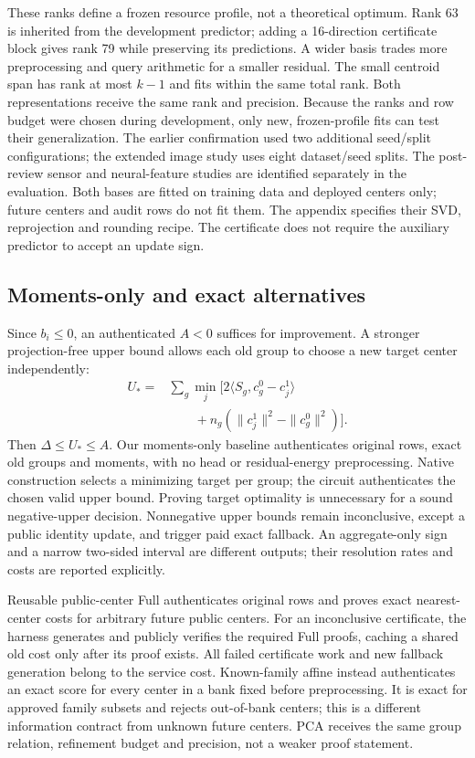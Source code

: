 These ranks define a frozen resource profile, not a theoretical optimum.
Rank 63 is inherited from the development predictor; adding a 16-direction
certificate block gives rank 79 while preserving its predictions. A wider
basis trades more preprocessing and query arithmetic for a smaller residual.
The small centroid span has rank at most $k-1$ and fits within the same total
rank. Both representations receive the same rank and precision. Because the
ranks and row budget were chosen during development, only new, frozen-profile
fits can test their generalization. The earlier confirmation used two
additional seed/split configurations; the extended image study uses eight
dataset/seed splits. The post-review sensor and neural-feature studies are
identified separately in the evaluation.
Both bases are fitted on training data and deployed centers only; future
centers and audit rows do not fit them. The appendix specifies their SVD,
reprojection and rounding recipe. The certificate does not require the
auxiliary predictor to accept an update sign.

\subsection{Moments-only and exact alternatives}
Since $b_i\leq0$, an authenticated $A<0$ suffices for improvement.
A stronger projection-free upper bound allows each old group to choose a
new target center independently:
\begin{align}\label{eq:moments-upper}
 U_*={}&\sum_g\min_j\bigl[2\langle S_g,c^0_g-c^1_j\rangle\nonumber\\
 &\qquad+n_g(\|c^1_j\|^2-\|c^0_g\|^2)\bigr].
\end{align}
Then $\Delta\leq U_*\leq A$. Our moments-only baseline authenticates original
rows, exact old groups and moments, with no head or residual-energy
preprocessing. Native construction selects a minimizing target per group;
the circuit authenticates the chosen valid upper bound. Proving target
optimality is unnecessary for a sound negative-upper decision. Nonnegative
upper bounds remain inconclusive, except a public identity update, and
trigger paid exact fallback. An aggregate-only sign and a narrow two-sided
interval are different outputs; their resolution rates and costs are reported
explicitly.

Reusable public-center Full authenticates original rows and proves exact
nearest-center costs for arbitrary future public centers. For an inconclusive
certificate, the harness generates and publicly verifies the required Full
proofs, caching a shared old cost only after its proof exists. All failed
certificate work and new fallback generation belong to the service cost.
Known-family affine instead authenticates an exact score for every center in a
bank fixed before preprocessing. It is exact for approved family subsets and
rejects out-of-bank centers; this is a different information contract from
unknown future centers. PCA receives the same group relation, refinement budget and precision,
not a weaker proof statement.

